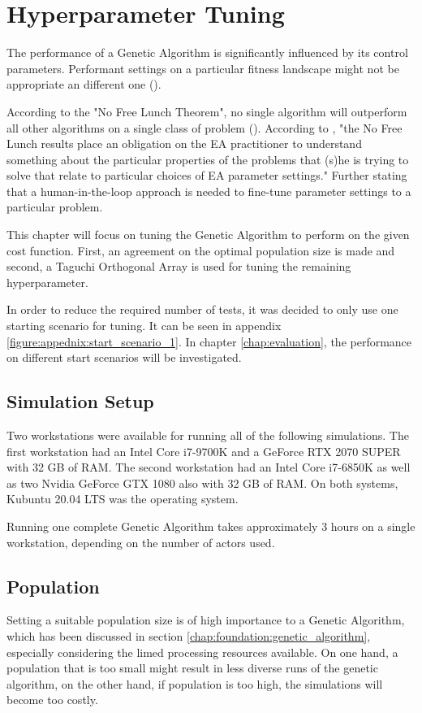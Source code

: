 \chapter{Hyperparameter Tuning}
\label{chap:hyperparameter_tuning}
The performance of a Genetic Algorithm is significantly influenced by its control parameters. Performant settings on a particular fitness landscape might not be appropriate an different one (\cite{kacprzyk_parameter_2007}).

According to the "No Free Lunch Theorem", no single algorithm will outperform all other algorithms on a single class of problem (\cite{kacprzyk_parameter_2007}). According to \cite{kacprzyk_parameter_2007}, "the No Free Lunch results place an obligation on the EA practitioner to understand something about the particular properties of the problems that (s)he is trying to solve that relate to particular choices of EA parameter settings."
Further stating that a human-in-the-loop approach is needed to fine-tune parameter settings to a particular problem.

This chapter will focus on tuning the Genetic Algorithm to perform on the given cost function. First, an agreement on the optimal population size is made and second, a Taguchi Orthogonal Array is used for tuning the remaining hyperparameter.

In order to reduce the required number of tests, it was decided to only use one starting scenario for tuning. It can be seen in appendix \ref{figure:appednix:start_scenario_1}. In chapter \ref{chap:evaluation}, the performance on different start scenarios will be investigated.

\section{Simulation Setup}
Two workstations were available for running all of the following simulations. The first workstation had an Intel Core i7-9700K and a GeForce RTX 2070 SUPER with 32 GB of RAM. The second workstation had an Intel Core i7-6850K as well as two Nvidia GeForce GTX 1080 also with 32 GB of RAM. On both systems, Kubuntu 20.04 LTS was the operating system.

Running one complete Genetic Algorithm takes approximately 3 hours on a single workstation, depending on the number of actors used.

\section{Population}
\label{chap:hyperparameter_tuning:population}
Setting a suitable population size is of high importance to a Genetic Algorithm, which has been discussed in section \ref{chap:foundation:genetic_algorithm}, especially considering the limed processing resources available. On one hand, a population that is too small might result in less diverse runs of the genetic algorithm, on the other hand, if population is too high, the simulations will become too costly.

